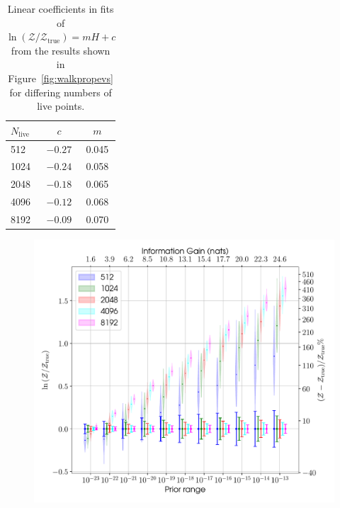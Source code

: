\begin{table}[h]
\caption{Linear coefficients in fits of $\ln{(\mathcal{Z}/\mathcal{Z}_{\text{true}})} = mH + c$ from the results
shown in Figure~\ref{fig:walkpropevs} for differing numbers of live points.\label{tab:klvsz}}
\begin{center}
\begin{tabular}{l c c}
\hline
\hline
$N_{\text{live}}$ & $c$ & $m$ \\
\hline
512 & $-0.27$ & 0.045 \\
1024 & $-0.24$ & 0.058 \\
2048 & $-0.18$ & 0.065 \\
4096 & $-0.12$ & 0.068 \\
8192 & $-0.09$ & 0.070 \\
\hline
\end{tabular}
\end{center}
\end{table}

\begin{figure}[phtb]
\begin{center}
\includegraphics[width=1\columnwidth]{./figures/proptesting/walk_prop/evidences/collate_plots_wp_evidences}
\caption{ \protect}
\end{center}
\end{figure}

